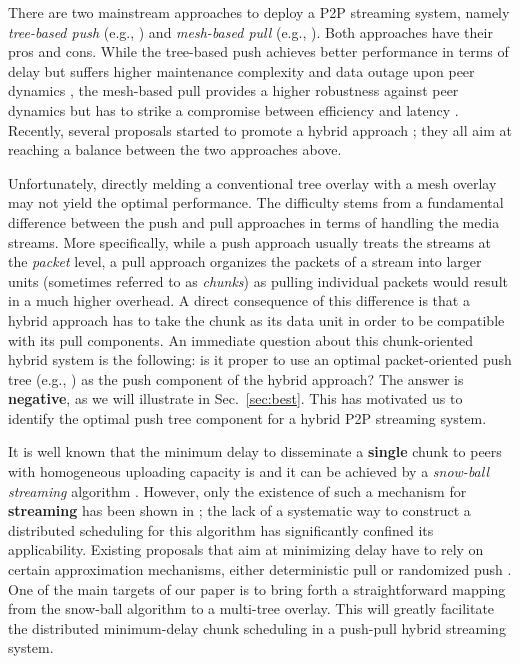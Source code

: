 \documentclass[conference]{IEEEtran}
\begin{document}
  There are two mainstream approaches to deploy a P2P streaming system, namely \textit{tree-based push} (e.g., \cite{BanerjeeBK-SIGCOMM02,CastroDKNRS-SOSP03,VenkataramanYF-ICNP06}) and \textit{mesh-based pull} (e.g., \cite{ZhangLLY-INFOCOM05,HeiLR-IEEECOMMAG08,LiXQKLLZ-INFOCOM08}). Both approaches have their pros and cons. While the tree-based push achieves better performance in terms of delay but suffers higher maintenance complexity and data outage upon peer dynamics \cite{MaghareiRG-INFOCOM07}, the mesh-based pull provides a higher robustness against peer dynamics but has to strike a compromise between efficiency and latency \cite{FengLL-INFOCOM09}. Recently, several proposals started to promote a hybrid approach \cite{WangXL-ICDCS07,ZhangZSY-IEEEJSAC07,WangLX-INFOCOM08}; they all aim at reaching a balance between the two approaches above.

  Unfortunately, directly melding a conventional tree overlay with a mesh overlay may not yield the optimal performance. The difficulty stems from a fundamental difference between the push and pull approaches in terms of handling the media streams. More specifically, while a push approach usually treats the streams at the \textit{packet} level, a pull approach organizes the packets of a stream into larger units (sometimes referred to as \textit{chunks}) as pulling individual packets would result in a much higher overhead. A direct consequence of this difference is that a hybrid approach has to take the chunk as its data unit in order to be compatible with its pull components. An immediate question about this chunk-oriented hybrid system is the following: is it proper to use an optimal packet-oriented push tree (e.g., \cite{LiuSJRC-SIGMETRICS08}) as the push component of the hybrid approach? The answer is \textbf{negative}, as we will illustrate in Sec.~\ref{sec:best}. This has motivated us to identify the optimal push tree component for a hybrid P2P streaming system.

  It is well known that the minimum delay to disseminate a \textbf{single} chunk to  peers with homogeneous uploading capacity is  and it can be achieved by a \textit{snow-ball streaming} algorithm \cite{Liu-MM07}. However, only the existence of such a mechanism for \textbf{streaming} has been shown in \cite{Liu-MM07}; the lack of a systematic way to construct a distributed scheduling for this algorithm has significantly confined its applicability. Existing proposals that aim at minimizing delay have to rely on certain approximation mechanisms, either deterministic pull \cite{FengLL-INFOCOM09} or randomized push \cite{BonaldMMPT-SIGMETRICS08}. One of the main targets of our paper is to bring forth a straightforward mapping from the snow-ball algorithm to a multi-tree overlay. This will greatly facilitate the distributed minimum-delay chunk scheduling in a push-pull hybrid streaming system.
\end{document}
